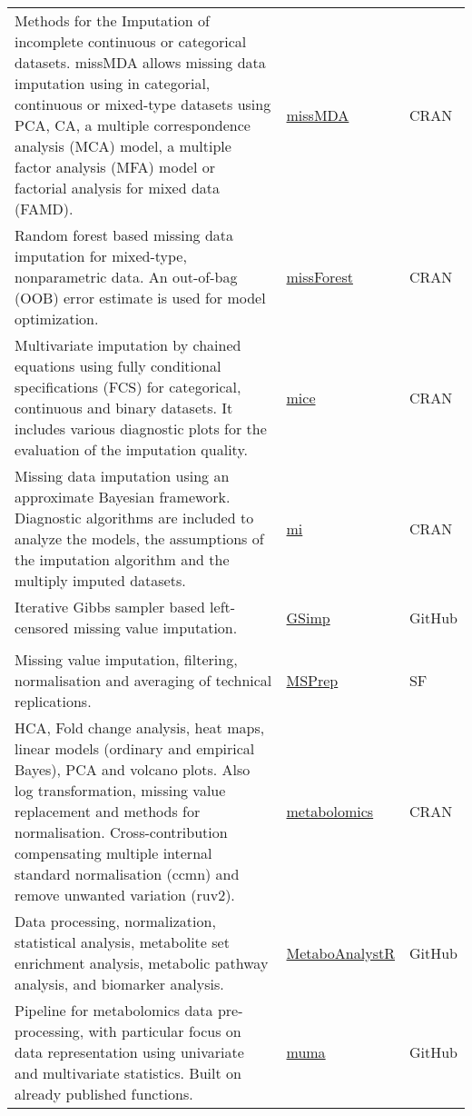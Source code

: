 \documentclass[]{article}
\begin{document}
\begin{longtable}{>{\raggedright\arraybackslash}p{30em}>{\raggedright\arraybackslash}p{10em}>{\raggedright\arraybackslash}p{3em}}
Methods for the Imputation of incomplete continuous or categorical datasets. missMDA allows missing data imputation using in categorial, continuous or mixed-type datasets using PCA, CA, a multiple correspondence analysis (MCA) model, a multiple factor analysis (MFA) model or factorial analysis for mixed data (FAMD). & \href{NA}{missMDA} & CRAN\\
\rowcolor{gray!6}  Random forest based missing data imputation for mixed-type, nonparametric data. An out-of-bag (OOB) error estimate is used for model optimization. & \href{NA}{missForest} & CRAN\\
Multivariate imputation by chained equations using fully conditional specifications (FCS) for categorical, continuous and binary datasets. It includes various diagnostic plots for the evaluation of the imputation quality. & \href{NA}{mice} & CRAN\\
\rowcolor{gray!6}  Missing data imputation using an approximate Bayesian framework. Diagnostic algorithms are included to analyze the models, the assumptions of the imputation algorithm and the multiply imputed datasets. & \href{NA}{mi} & CRAN\\
Iterative Gibbs sampler based left-censored missing value imputation. & \href{NA}{GSimp} & GitHub\\
\rowcolor{gray!6}  \addlinespace[0.3em]
\multicolumn{3}{l}{\textbf{Multiple workflow steps}}\\
Missing value imputation, filtering, normalisation and averaging of technical replications. & \href{https://sourceforge.net/projects/msprep/}{MSPrep} & SF\\
HCA, Fold change analysis, heat maps, linear models (ordinary and empirical Bayes), PCA and volcano plots. Also log transformation, missing value replacement and methods for normalisation. Cross-contribution compensating multiple internal standard normalisation (ccmn) and remove unwanted variation (ruv2). & \href{https://cran.r-project.org/package=metabolomics}{metabolomics} & CRAN\\
\rowcolor{gray!6}  Data processing, normalization, statistical analysis, metabolite set enrichment analysis, metabolic pathway analysis, and biomarker analysis. & \href{https://github.com/xia-lab/MetaboAnalystR}{MetaboAnalystR} & GitHub\\
Pipeline for metabolomics data pre-processing, with particular focus on data representation using univariate and multivariate statistics. Built on already published functions. & \href{https://cran.r-project.org/web/packages/muma/index.html}{muma} & GitHub\\

\end{longtable}
\end{document}
